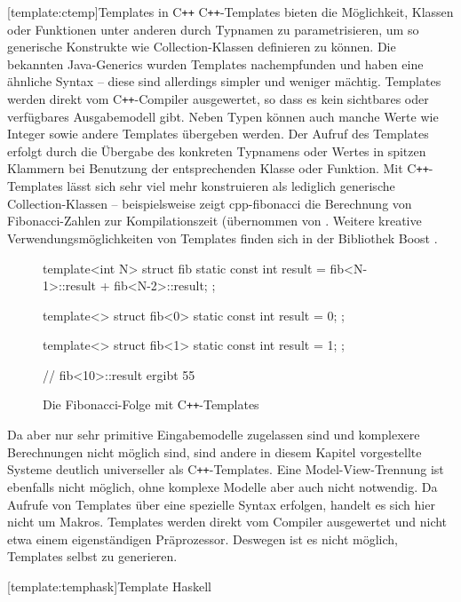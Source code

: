 \documentclass[11pt, a4paper, bibgerm]{scrbook}
\newenvironment{DIFnomarkup}{}{}
\newcommand\lsection{}
\newcommand\abb{}
\newcommand{\cpp}{C\texttt{++}}
\begin{document}
\lsection[template:ctemp]{Templates in \cpp{}} \cpp{}-Templates bieten
die Möglichkeit, Klassen oder Funktionen unter anderen durch Typnamen zu
parametrisieren, um so generische Konstrukte wie Collection-Klassen
definieren zu können. Die bekannten Java-Generics  \cite{JavaGenerics}
wurden Templates nachempfunden und haben eine ähnliche Syntax -- diese
sind allerdings simpler und weniger mächtig. Templates werden direkt vom
\cpp{}-Compiler ausgewertet, so dass es kein sichtbares oder verfügbares
Ausgabemodell gibt. Neben Typen können auch manche Werte wie Integer
sowie andere Templates übergeben werden. Der Aufruf des Templates
erfolgt durch die Übergabe des konkreten Typnamens oder Wertes in
spitzen Klammern bei Benutzung der entsprechenden Klasse oder
Funktion. Mit \cpp{}-Templates lässt sich sehr viel mehr konstruieren
als lediglich generische Collection-Klassen -- beispielsweise zeigt
\abb{cpp-fibonacci} die Berechnung von Fibonacci-Zahlen zur
Kompilationszeit (übernommen von \cite{CppFib}. Weitere kreative
Verwendungsmöglichkeiten von Templates finden sich in der Bibliothek
Boost \cite{Boost}.
\begin{figure}
  \centering
  \begin{DIFnomarkup}\begin{code}
template<int N> struct fib {
  static const int result = fib<N-1>::result + fib<N-2>::result;
};

template<> struct fib<0> {
  static const int result = 0;
};

template<> struct fib<1> {
  static const int result = 1;
};

// fib<10>::result ergibt 55
  \end{code}\end{DIFnomarkup}
  \caption{Die Fibonacci-Folge mit \cpp{}-Templates}
  \label{magicl:fig:cpp-fibonacci}
\end{figure}
Da aber nur sehr primitive Eingabemodelle zugelassen sind und komplexere
Berechnungen nicht möglich sind, sind andere in diesem Kapitel
vorgestellte Systeme deutlich universeller als \cpp{}-Templates. Eine
Model-View-Trennung ist ebenfalls nicht möglich, ohne komplexe Modelle
aber auch nicht notwendig. Da Aufrufe von Templates über eine spezielle
Syntax erfolgen, handelt es sich hier nicht um Makros. Templates werden
direkt vom Compiler ausgewertet und nicht etwa einem eigenständigen
Präprozessor. Deswegen ist es nicht möglich, Templates selbst zu
generieren.

\lsection[template:temphask]{Template Haskell}
\end{document}
